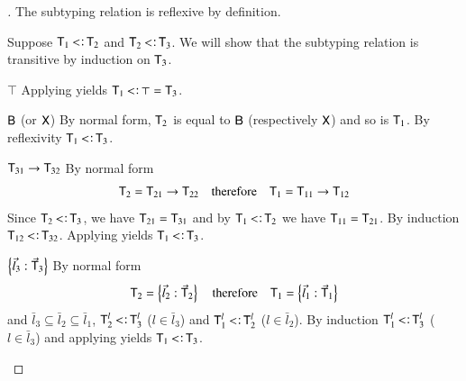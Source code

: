 \documentclass{report}
\begin{document}
  \begin{proof}[]
    The subtyping relation is reflexive by definition.
    
    Suppose $\type{T}_1\subtype\type{T}_2$ and $\type{T}_2\subtype\type{T}_3$.
    We will show that the subtyping relation is transitive by induction on $\textsf{T}_3$.
    \begin{indcase}{$\top$}
      Applying \stoptype yields $\type{T}_1\subtype\top=\type{T}_3$.
    \end{indcase}
    \begin{indcase}{$\textsf{B}$ (or $\textsf{X}$)}
      By normal form, $\textsf{T}_2$ is equal to $\textsf{B}$ (respectively $\textsf{X}$)
      and so is $\textsf{T}_1$.
      By reflexivity $\type{T}_1\subtype\type{T}_3$.
    \end{indcase}
    \begin{indcase}{$\textsf{T}_{31}\rightarrow\textsf{T}_{32}$}
      By normal form
      \begin{displaymath}
        \textsf{T}_2=\textsf{T}_{21}\rightarrow\textsf{T}_{22}\quad\textrm{therefore}\quad
        \textsf{T}_1=\textsf{T}_{11}\rightarrow\textsf{T}_{12}
      \end{displaymath}
      Since $\type{T}_2\subtype\type{T}_3$, we have $\textsf{T}_{21}=\textsf{T}_{31}$ and
      by $\type{T}_1\subtype\type{T}_2$ we have $\textsf{T}_{11}=\textsf{T}_{21}$. By induction
      $\type{T}_{12}\subtype\type{T}_{32}$. Applying \sfun yields
      $\type{T}_1\subtype\type{T}_3$.
    \end{indcase}
    \begin{indcase}{$\left\{\vec{l}_3:\vec{\textsf{T}}_3\right\}$}
      By normal form
      \begin{displaymath}
        \textsf{T}_2=\left\{\vec{l}_2:\vec{\textsf{T}}_2\right\}\quad\textrm{therefore}\quad
        \textsf{T}_1=\left\{\vec{l}_1:\vec{\textsf{T}}_1\right\}
      \end{displaymath}
      and $\bar{l}_3\subseteq\bar{l}_2\subseteq\bar{l}_1$,
      $\type{T}_2^l\subtype\type{T}_3^l$ ($l\in\bar{l}_3$) and
      $\type{T}_1^l\subtype\type{T}_2^l$ ($l\in\bar{l}_2$).
      By induction $\type{T}_1^l\subtype\type{T}_3^l$ ($l\in\bar{l}_3$) and applying
      \srec yields $\type{T}_1\subtype\type{T}_3$.
    \end{indcase}
    

\end{proof}
\end{document}
